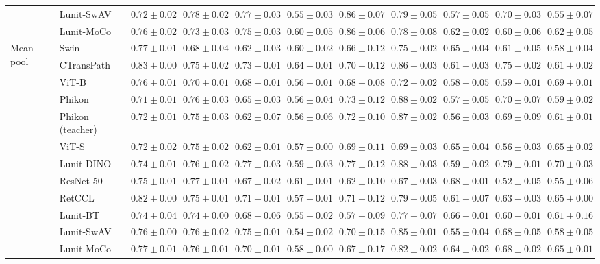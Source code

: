 \begin{tabular}{ll|cccc|c|cccc}
 & Lunit-SwAV & $0.72 \pm 0.02$ & $\mathbf{0.78 \pm 0.02}$ & $0.77 \pm 0.03$ & $0.55 \pm 0.03$ & $0.86 \pm 0.07$ & $0.79 \pm 0.05$ & $0.57 \pm 0.05$ & $0.70 \pm 0.03$ & $0.55 \pm 0.07$ \\
 & Lunit-MoCo & $0.76 \pm 0.02$ & $0.73 \pm 0.03$ & $0.75 \pm 0.03$ & $0.60 \pm 0.05$ & $0.86 \pm 0.06$ & $0.78 \pm 0.08$ & $0.62 \pm 0.02$ & $0.60 \pm 0.06$ & $0.62 \pm 0.05$ \\
\cline{1-11}
\multirow[t]{12}{*}{Mean pool} & Swin & $0.77 \pm 0.01$ & $0.68 \pm 0.04$ & $0.62 \pm 0.03$ & $0.60 \pm 0.02$ & $0.66 \pm 0.12$ & $0.75 \pm 0.02$ & $0.65 \pm 0.04$ & $0.61 \pm 0.05$ & $0.58 \pm 0.04$ \\
 & CTransPath & $\mathbf{0.83 \pm 0.00}$ & $0.75 \pm 0.02$ & $0.73 \pm 0.01$ & $\mathbf{0.64 \pm 0.01}$ & $0.70 \pm 0.12$ & $0.86 \pm 0.03$ & $0.61 \pm 0.03$ & $0.75 \pm 0.02$ & $0.61 \pm 0.02$ \\
 & ViT-B & $0.76 \pm 0.01$ & $0.70 \pm 0.01$ & $0.68 \pm 0.01$ & $0.56 \pm 0.01$ & $0.68 \pm 0.08$ & $0.72 \pm 0.02$ & $0.58 \pm 0.05$ & $0.59 \pm 0.01$ & $0.69 \pm 0.01$ \\
 & Phikon & $0.71 \pm 0.01$ & $0.76 \pm 0.03$ & $0.65 \pm 0.03$ & $0.56 \pm 0.04$ & $0.73 \pm 0.12$ & $0.88 \pm 0.02$ & $0.57 \pm 0.05$ & $0.70 \pm 0.07$ & $0.59 \pm 0.02$ \\
 & Phikon (teacher) & $0.72 \pm 0.01$ & $0.75 \pm 0.03$ & $0.62 \pm 0.07$ & $0.56 \pm 0.06$ & $0.72 \pm 0.10$ & $0.87 \pm 0.02$ & $0.56 \pm 0.03$ & $0.69 \pm 0.09$ & $0.61 \pm 0.01$ \\
 & ViT-S & $0.72 \pm 0.02$ & $0.75 \pm 0.02$ & $0.62 \pm 0.01$ & $0.57 \pm 0.00$ & $0.69 \pm 0.11$ & $0.69 \pm 0.03$ & $0.65 \pm 0.04$ & $0.56 \pm 0.03$ & $0.65 \pm 0.02$ \\
 & Lunit-DINO & $0.74 \pm 0.01$ & $0.76 \pm 0.02$ & $\mathbf{0.77 \pm 0.03}$ & $0.59 \pm 0.03$ & $\mathbf{0.77 \pm 0.12}$ & $\mathbf{0.88 \pm 0.03}$ & $0.59 \pm 0.02$ & $\mathbf{0.79 \pm 0.01}$ & $\mathbf{0.70 \pm 0.03}$ \\
 & ResNet-50 & $0.75 \pm 0.01$ & $\mathbf{0.77 \pm 0.01}$ & $0.67 \pm 0.02$ & $0.61 \pm 0.01$ & $0.62 \pm 0.10$ & $0.67 \pm 0.03$ & $\mathbf{0.68 \pm 0.01}$ & $0.52 \pm 0.05$ & $0.55 \pm 0.06$ \\
 & RetCCL & $0.82 \pm 0.00$ & $0.75 \pm 0.01$ & $0.71 \pm 0.01$ & $0.57 \pm 0.01$ & $0.71 \pm 0.12$ & $0.79 \pm 0.05$ & $0.61 \pm 0.07$ & $0.63 \pm 0.03$ & $0.65 \pm 0.00$ \\
 & Lunit-BT & $0.74 \pm 0.04$ & $0.74 \pm 0.00$ & $0.68 \pm 0.06$ & $0.55 \pm 0.02$ & $0.57 \pm 0.09$ & $0.77 \pm 0.07$ & $0.66 \pm 0.01$ & $0.60 \pm 0.01$ & $0.61 \pm 0.16$ \\
 & Lunit-SwAV & $0.76 \pm 0.00$ & $0.76 \pm 0.02$ & $0.75 \pm 0.01$ & $0.54 \pm 0.02$ & $0.70 \pm 0.15$ & $0.85 \pm 0.01$ & $0.55 \pm 0.04$ & $0.68 \pm 0.05$ & $0.58 \pm 0.05$ \\
 & Lunit-MoCo & $0.77 \pm 0.01$ & $0.76 \pm 0.01$ & $0.70 \pm 0.01$ & $0.58 \pm 0.00$ & $0.67 \pm 0.17$ & $0.82 \pm 0.02$ & $0.64 \pm 0.02$ & $0.68 \pm 0.02$ & $0.65 \pm 0.01$ \\
\cline{1-11}
\bottomrule
\end{tabular}
